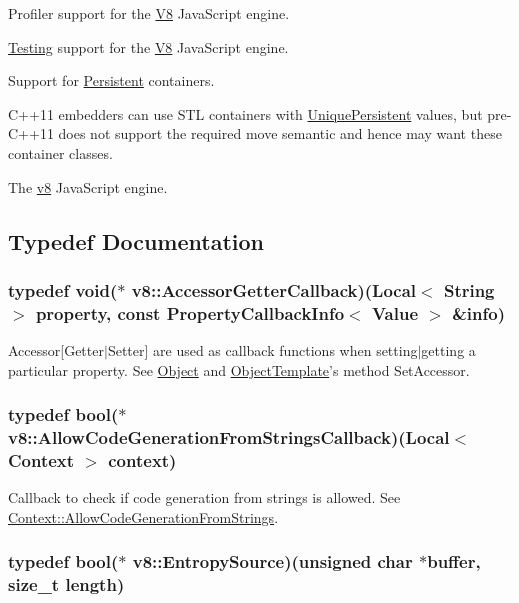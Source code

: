 Profiler support for the \hyperlink{classv8_1_1V8}{V8} Java\-Script engine.

\hyperlink{classv8_1_1Testing}{Testing} support for the \hyperlink{classv8_1_1V8}{V8} Java\-Script engine.

Support for \hyperlink{classv8_1_1Persistent}{Persistent} containers.

C++11 embedders can use S\-T\-L containers with \hyperlink{classv8_1_1UniquePersistent}{Unique\-Persistent} values, but pre-\/\-C++11 does not support the required move semantic and hence may want these container classes.

The \hyperlink{namespacev8}{v8} Java\-Script engine. 

\subsection{Typedef Documentation}
\hypertarget{namespacev8_a2676a71943fdebd2e0a09fc256de6ff9}{
\subsubsection[{Accessor\-Getter\-Callback}]{\setlength{\rightskip}{0pt plus 5cm}typedef void($\ast$ v8\-::\-Accessor\-Getter\-Callback)({\bf Local}$<$ {\bf String} $>$ property, const {\bf Property\-Callback\-Info}$<$ {\bf Value} $>$ \&info)}}\label{namespacev8_a2676a71943fdebd2e0a09fc256de6ff9}
Accessor\mbox{[}Getter$|$\-Setter\mbox{]} are used as callback functions when setting$|$getting a particular property. See \hyperlink{classv8_1_1Object}{Object} and \hyperlink{classv8_1_1ObjectTemplate}{Object\-Template}'s method Set\-Accessor. \hypertarget{namespacev8_ac236e6d6b2b45dd69a3fa4408d63353f}{
\subsubsection[{Allow\-Code\-Generation\-From\-Strings\-Callback}]{\setlength{\rightskip}{0pt plus 5cm}typedef bool($\ast$ v8\-::\-Allow\-Code\-Generation\-From\-Strings\-Callback)({\bf Local}$<$ {\bf Context} $>$ context)}}\label{namespacev8_ac236e6d6b2b45dd69a3fa4408d63353f}
Callback to check if code generation from strings is allowed. See \hyperlink{classv8_1_1Context_a794ccc42113566f5d363f89c8b0d3c2c}{Context\-::\-Allow\-Code\-Generation\-From\-Strings}. \hypertarget{namespacev8_a3a9840e090970cbda2427cf6f5594fba}{
\subsubsection[{Entropy\-Source}]{\setlength{\rightskip}{0pt plus 5cm}typedef bool($\ast$ v8\-::\-Entropy\-Source)(unsigned char $\ast$buffer, size\-\_\-t length)}}\label{namespacev8_a3a9840e090970cbda2427cf6f5594fba}
